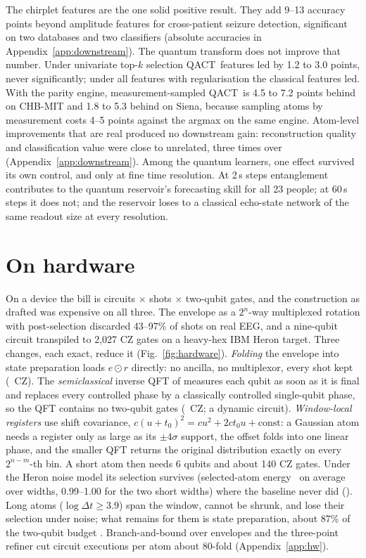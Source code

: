 \documentclass{article}
\newcommand{\qact}{QACT}
\begin{document}
The chirplet features are the one solid positive result. They add 9--13 accuracy points beyond amplitude features for cross-patient seizure detection, significant on two databases and two classifiers (absolute accuracies in Appendix~\ref{app:downstream}). The quantum transform does not improve that number. Under univariate top-$k$ selection \qact\ features led by 1.2 to 3.0 points, never significantly; under all features with regularisation the classical features led. With the parity engine, measurement-sampled \qact\ is 4.5 to 7.2 points behind on CHB-MIT and 1.8 to 5.3 behind on Siena, because sampling atoms by measurement costs 4--5 points against the argmax on the same engine. Atom-level improvements that are real produced no downstream gain: reconstruction quality and classification value were close to unrelated, three times over (Appendix~\ref{app:downstream}). Among the quantum learners, one effect survived its own control, and only at fine time resolution. At 2\,s steps entanglement contributes to the quantum reservoir's forecasting skill for all 23 people; at 60\,s steps it does not; and the reservoir loses to a classical echo-state network of the same readout size at every resolution.

\section{On hardware}
\label{sec:hw}
On a device the bill is circuits $\times$ shots $\times$ two-qubit gates, and the construction as drafted was expensive on all three. The envelope as a $2^n$-way multiplexed rotation with post-selection discarded 43--97\% of shots on real EEG, and a nine-qubit circuit transpiled to 2,027 CZ gates on a heavy-hex IBM Heron target. Three changes, each exact, reduce it (Fig.~\ref{fig:hardware}). \emph{Folding} the envelope into state preparation loads $e\odot r$ directly: no ancilla, no multiplexor, every shot kept (\hwFoldedCZ\ CZ). The \emph{semiclassical} inverse QFT of \citet{griffiths1996semiclassical} measures each qubit as soon as it is final and replaces every controlled phase by a classically controlled single-qubit phase, so the QFT contains no two-qubit gates (\hwSemiclassicalCZ\ CZ; a dynamic circuit). \emph{Window-local registers} use shift covariance, $c(u+t_0)^2=cu^2+2ct_0u+\text{const}$: a Gaussian atom needs a register only as large as its $\pm4\sigma$ support, the offset folds into one linear phase, and the smaller QFT returns the original distribution exactly on every $2^{n-m}$-th bin. A short atom then needs 6 qubits and about 140 CZ gates. Under the Heron noise model its selection survives (selected-atom energy \hwWindowedSel\ on average over widths, 0.99--1.00 for the two short widths) where the baseline never did (\hwBaselineSel). Long atoms ($\log\Delta t\ge3.9$) span the window, cannot be shrunk, and lose their selection under noise; what remains for them is state preparation, about 87\% of the two-qubit budget \citep{holmes2020efficient,moosa2023linear}. Branch-and-bound over envelopes and the three-point refiner cut circuit executions per atom about 80-fold (Appendix~\ref{app:hw}).
\end{document}
